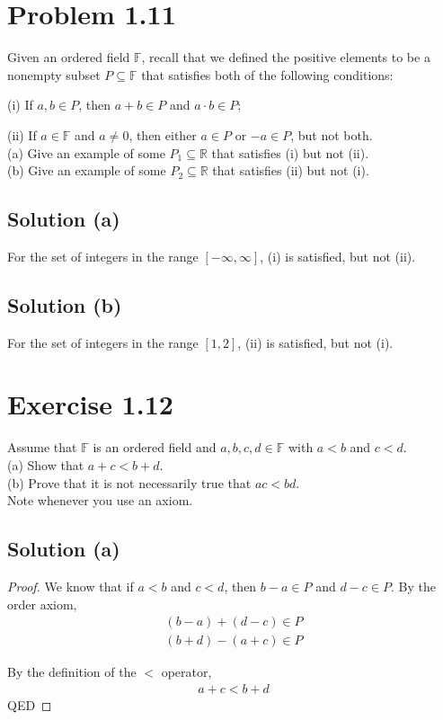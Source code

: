 \documentclass[12pt]{report}
\begin{document}
\pagebreak
\section{Problem 1.11}
Given an ordered field $\mathbb{F}$, recall that we defined the positive elements to be a nonempty subset $P \subseteq \mathbb{F}$ that satisfies both of the following conditions:

(i) If $a, b \in P$, then $a + b \in P$ and $a \cdot b \in P$;  

(ii) If $a \in \mathbb{F}$ and $a \ne 0$, then either $a \in P$ or $-a \in P$, but not  both. \\
(a) Give an example of some $P_1 \subseteq \mathbb{R}$ that satisfies (i) but not (ii).\\
(b) Give an example of some $P_2 \subseteq \mathbb{R}$ that satisfies (ii) but not (i). 

\subsection{Solution (a)}
For the set of integers in the range $[-\infty,\infty]$, (i) is satisfied, but not (ii). 

\subsection{Solution (b)}
For the set of integers in the range $[1,2]$, (ii) is satisfied, but not (i). 


\pagebreak
\section{Exercise 1.12}
Assume that $\mathbb{F}$ is an ordered field and $a, b, c, d \in \mathbb{F}$ with $a<b$ and $c<d$. \\
(a) Show that $a + c < b + d$. \\
(b) Prove that it is not necessarily true that $ac < bd$. \\
Note whenever you use an axiom. 

\subsection{Solution (a)}
\begin{proof}
    We know that if $a<b$ and $c<d$, then $b - a \in P$ and $d - c \in P$.
    By the order axiom, 
    \begin{gather}
        (b - a) + (d - c) \in P\\
        (b + d) - (a + c) \in P
    \end{gather}

    By the definition of the $<$ operator,
    \begin{gather}
        a + c < b + d
    \end{gather}
    QED
\end{proof}
\end{document}
